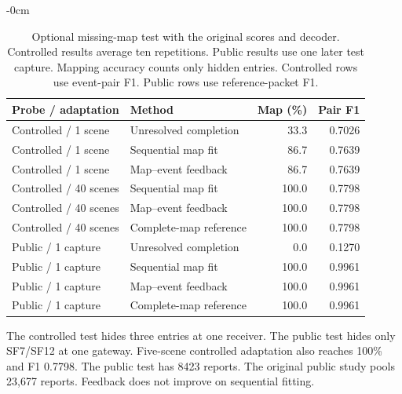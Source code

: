 \begin{table}[!t]\begin{adjustwidth}{-\extralength}{0cm}
\caption{Optional missing-map test with the original scores and decoder. Controlled results average ten repetitions. Public results use one later test capture. Mapping accuracy counts only hidden entries. Controlled rows use event-pair F1. Public rows use reference-packet F1.}\label{tab:partial_probe}
\small\setlength{\tabcolsep}{5pt}\renewcommand{\arraystretch}{1.10}
\begin{tabularx}{\linewidth}{@{}lYrr@{}}\toprule
Probe / adaptation & Method & Map (\%) & Pair F1\\\midrule
Controlled / 1 scene & Unresolved completion & 33.3 & 0.7026\\
Controlled / 1 scene & Sequential map fit & 86.7 & 0.7639\\
Controlled / 1 scene & Map--event feedback & 86.7 & 0.7639\\
Controlled / 40 scenes & Sequential map fit & 100.0 & 0.7798\\
Controlled / 40 scenes & Map--event feedback & 100.0 & 0.7798\\
Controlled / 40 scenes & Complete-map reference & 100.0 & 0.7798\\
\midrule
Public / 1 capture & Unresolved completion & 0.0 & 0.1270\\
Public / 1 capture & Sequential map fit & 100.0 & 0.9961\\
Public / 1 capture & Map--event feedback & 100.0 & 0.9961\\
Public / 1 capture & Complete-map reference & 100.0 & 0.9961\\
\bottomrule\end{tabularx}
\par\vspace{3pt}\footnotesize The controlled test hides three entries at one receiver. The public test hides only SF7/SF12 at one gateway. Five-scene controlled adaptation also reaches 100\% and F1 0.7798. The public test has 8423 reports. The original public study pools 23,677 reports. Feedback does not improve on sequential fitting.
\end{adjustwidth}\end{table}
